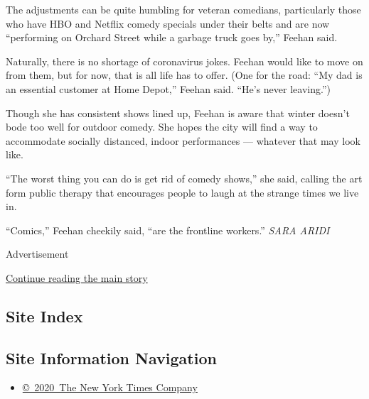 The adjustments can be quite humbling for veteran comedians,
particularly those who have HBO and Netflix comedy specials under their
belts and are now ``performing on Orchard Street while a garbage truck
goes by,'' Feehan said.

Naturally, there is no shortage of coronavirus jokes. Feehan would like
to move on from them, but for now, that is all life has to offer. (One
for the road: ``My dad is an essential customer at Home Depot,'' Feehan
said. ``He's never leaving.'')

Though she has consistent shows lined up, Feehan is aware that winter
doesn't bode too well for outdoor comedy. She hopes the city will find a
way to accommodate socially distanced, indoor performances --- whatever
that may look like.

``The worst thing you can do is get rid of comedy shows,'' she said,
calling the art form public therapy that encourages people to laugh at
the strange times we live in.

``Comics,'' Feehan cheekily said, ``are the frontline workers.''
\emph{SARA ARIDI}

Advertisement

\protect\hyperlink{after-bottom}{Continue reading the main story}

\hypertarget{site-index}{%
\subsection{Site Index}\label{site-index}}

\hypertarget{site-information-navigation}{%
\subsection{Site Information
Navigation}\label{site-information-navigation}}

\begin{itemize}
\tightlist
\item
  \href{https://help.nytimes3xbfgragh.onion/hc/en-us/articles/115014792127-Copyright-notice}{©~2020~The
  New York Times Company}
\end{itemize}

